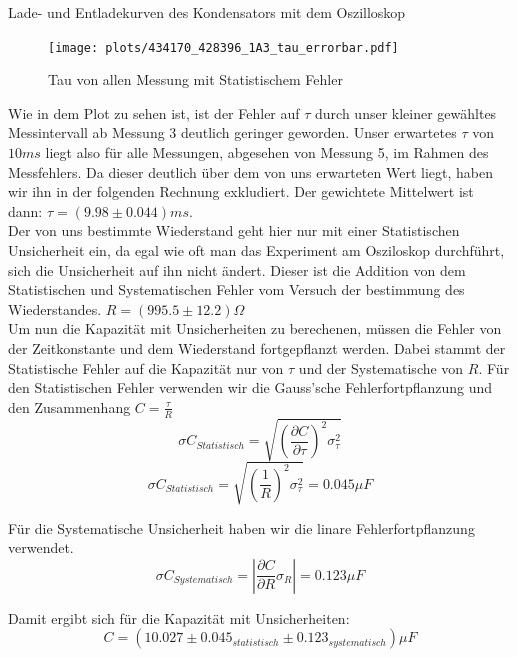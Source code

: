 \documentclass[twoside]{protokoll}
\begin{document}
\begin{aufgabe}{Lade- und Entladekurven des Kondensators mit dem Oszilloskop}
\begin{figure}[H]
  \centering
    \texttt{[image: plots/434170\_428396\_1A3\_tau\_errorbar.pdf]}
    \caption{Tau von allen Messung mit Statistischem Fehler}
  \centering
\end{figure}
Wie in dem Plot zu sehen ist, ist der Fehler auf $\tau$ durch unser kleiner gewähltes Messintervall ab Messung 3 deutlich geringer geworden.
Unser erwartetes $\tau$ von $10ms$ liegt also für alle Messungen, abgesehen von Messung 5, im Rahmen des Messfehlers.
Da dieser deutlich über dem von uns erwarteten Wert liegt, haben wir ihn in der folgenden Rechnung exkludiert.
Der gewichtete Mittelwert ist dann: $\tau = (9.98 \pm 0.044)ms$.\\

Der von uns bestimmte Wiederstand geht hier nur mit einer Statistischen Unsicherheit ein, da egal wie oft man das Experiment am Osziloskop durchführt, sich die Unsicherheit auf ihn nicht ändert.
Dieser ist die Addition von dem Statistischen und Systematischen Fehler vom Versuch der bestimmung des Wiederstandes.
$ R = (995.5 \pm 12.2) \Omega$\\


Um nun die Kapazität mit Unsicherheiten zu berechenen, müssen die Fehler von der Zeitkonstante und dem Wiederstand fortgepflanzt werden.
Dabei stammt der Statistische Fehler auf die Kapazität nur von $\tau$ und der Systematische von $R$.
Für den Statistischen Fehler verwenden wir die Gauss'sche Fehlerfortpflanzung und den Zusammenhang $C = \frac{\tau}{R}$
\begin{equation}
    \sigma C_{Statistisch} = \sqrt{(\frac{\partial C}{\partial \tau})^2 \sigma_{\tau}^2}
\end{equation}
\begin{equation}
    \sigma C_{Statistisch} = \sqrt{(\frac{1}{R})^2 \sigma_{\tau}^2} = 0.045 \mu F
\end{equation}

Für die Systematische Unsicherheit haben wir die linare Fehlerfortpflanzung verwendet.
\begin{equation}
    \sigma C_{Systematisch} = |\frac{\partial C}{\partial R} \sigma_R| = 0.123 \mu F
\end{equation}

Damit ergibt sich für die Kapazität mit Unsicherheiten:
\begin{equation}
    C = (10.027 \pm 0.045_{statistisch} \pm 0.123_{systematisch}) \mu F
\end{equation}
 
\end{aufgabe}
\end{document}
